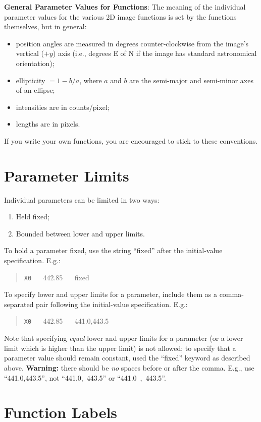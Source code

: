 \documentclass[10pt,a4paper,article]{memoir}
\begin{document}
\textbf{General Parameter Values for Functions}: The meaning of the individual
parameter values for the various 2D image functions is set by the functions
themselves, but in general: 
\begin{itemize}
\item position angles are measured in degrees counter-clockwise
from the image's vertical ($+y$) axis (i.e., degrees E of N if the image has standard
astronomical orientation);
\item ellipticity $= 1 - b/a$, where $a$ and $b$ are the
semi-major and semi-minor axes of an ellipse;
\item intensities are in counts/pixel;
\item lengths are in pixels. 
\end{itemize}
If you write your own functions, you are encouraged
to stick to these conventions.

\section{Parameter Limits}\label{sec:param-limits}

Individual parameters can be limited in two ways:
\begin{enumerate}
\item Held fixed;
\item Bounded between lower and upper limits.
\end{enumerate}
To hold a parameter fixed, use the string ``fixed'' after the initial-value
specification. E.g.:
\begin{quote}
\texttt{X0} ~~ 442.85 ~~ fixed
\end{quote}
To specify lower and upper limits for a parameter, include them as a comma-separated
pair following the initial-value specification. E.g.:
\begin{quote}
\texttt{X0} ~~ 442.85 ~~ 441.0,443.5
\end{quote}
Note that specifying \textit{equal} lower and upper limits for a parameter (or a lower limit
which is higher than the upper limit) is not allowed; to specify that a parameter
value should remain constant, used the ``fixed'' keyword as described above.
\textbf{Warning:} there should be \textit{no} spaces before or after the comma. E.g., use ``441.0,443.5'',
not ``441.0,~443.5'' or ``441.0~,~443.5''.


\section{Function Labels}
\end{document}
